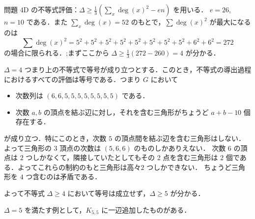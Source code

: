 \subsection{}
問題 4D の不等式評価：$\Delta \geq \frac13(\sum_x \deg(x)^2 - en)$ を用いる．
$e=26$, $n=10$ である．また $\sum_x \deg(x) = 52$ のもとで，$\sum \deg(x)^2$ が最大になるのは
\[
 \sum \deg(x)^2 = 5^2+5^2+5^2+5^2+5^2+5^2+5^2+5^2+6^2+6^2 = 272
\]
の場合に限られる．;まずここから $\Delta\geq \frac13(272 - 260) = 4$ が分かる．

$\Delta = 4$ つまり上の不等式で等号が成り立つとする．このとき，不等式の導出過程におけるすべての評価は等号である．つまり $G$ において
\begin{itemize}
 \item 次数列は $(6,6,5,5,5,5,5,5,5,5)$ である．
 \item 次数 $a, b$ の頂点を結ぶ辺に対し，それを含む三角形がちょうど $a+b-10$ 個存在する．
\end{itemize}
が成り立つ．特にこのとき，次数 $5$ の頂点間を結ぶ辺を含む三角形はしない．よって三角形の $3$ 頂点の次数は $(5,6,6)$ のものしかありえない．
次数 $6$ の頂点は $2$ つしかなくて，隣接していたとしてもその 2 点を含む三角形は $2$ 個である．よってこれらの制約のもと三角形は高々$2$ つしかできない．
ちょうど三角形を $4$ つ含むのは矛盾である．

よって不等式 $\Delta\geq 4$ において等号は成立せず，$\Delta \geq 5$ が分かる．

$\Delta = 5$ を満たす例として，$K_{5,5}$ に一辺追加したものがある．